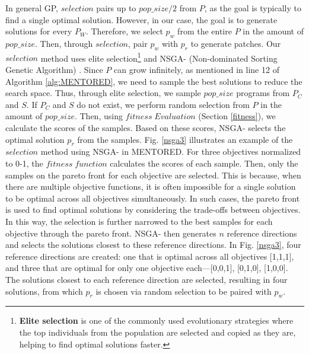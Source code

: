 \documentclass[10pt,conference]{IEEEtran}
\begin{document}
        In general GP, $selection$ pairs up to $pop\_size/2$ from $P$, as the goal is typically to find a single optimal solution. However, in our case, the goal is to generate solutions for every $P_{W}$. Therefore, we select $p_{w}$ from the entire $P$ in the amount of $pop\_size$. Then, through $selection$, pair $p_{w}$ with $p_{r}$ to generate patches. Our $selection$ method uses elite selection\footnote{\textbf{Elite selection} is one of the commonly used evolutionary strategies where the top individuals from the population are selected and copied as they are, helping to find optimal solutions faster.} and NSGA-\uppercase\expandafter{} (Non-dominated Sorting Genetic Algorithm) \cite{blank2019investigating}. Since $P$ can grow infinitely, as mentioned in line 12 of Algorithm \ref{alg:MENTORED}, we need to sample the best solutions to reduce the search space. Thus, through elite selection, we sample $pop\_size$ programs from $P_{C}$ and $S$. If $P_{C}$ and $S$ do not exist, we perform random selection from $P$ in the amount of $pop\_size$. Then, using $fitness\;Evaluation$ (Section \ref{fitness}), we calculate the scores of the samples. Based on these scores, NSGA-\uppercase\expandafter{} selects the optimal solution $p_{r}$ from the samples. Fig. \ref{nsga3} illustrates an example of the $selection$ method using NSGA-\uppercase\expandafter{} in MENTORED. For three objectives normalized to 0-1, the $fitness\;function$ calculates the scores of each sample. Then, only the samples on the pareto front for each objective are selected. This is because, when there are multiple objective functions, it is often impossible for a single solution to be optimal across all objectives simultaneously. In such cases, the pareto front is used to find optimal solutions by considering the trade-offs between objectives. In this way, the selection is further narrowed to the best samples for each objective through the pareto front. NSGA-\uppercase\expandafter{} then generates $n$ reference directions and selects the solutions closest to these reference directions. In Fig. \ref{nsga3}, four reference directions are created: one that is optimal across all objectives [1,1,1], and three that are optimal for only one objective each—[0,0,1], [0,1,0], [1,0,0]. The solutions closest to each reference direction are selected, resulting in four solutions, from which $p_{r}$ is chosen via random selection to be paired with $p_{w}$.
\end{document}
